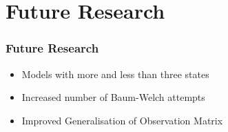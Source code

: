 \documentclass{beamer}
\begin{document}
    \section{Future Research}
    \begin{frame}
        \frametitle{Future Research}
        \begin{itemize}
            \item Models with more and less than three states
            \item Increased number of Baum-Welch attempts
            \item Improved Generalisation of Observation Matrix
        \end{itemize}
        
    \end{frame}
\end{document}
